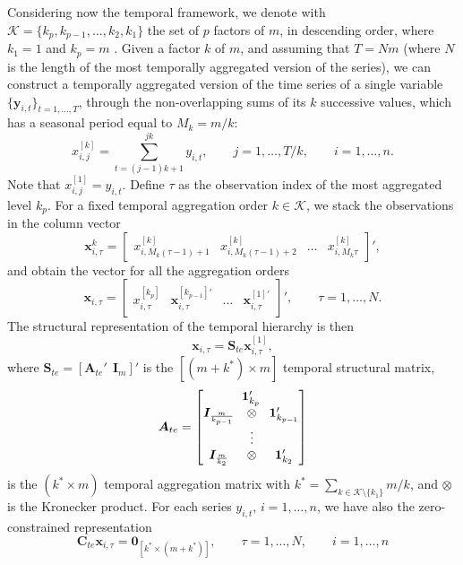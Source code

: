 \documentclass[a4paper,11pt]{article}
\newcommand{\Unovet}{\bm{1}}
\newcommand{\xvet}{\bm{x}}
\newcommand{\yvet}{\bm{y}}
\newcommand{\Avet}{\bm{A}}
\newcommand{\Cvet}{\bm{C}}
\newcommand{\Ivet}{\bm{I}}
\newcommand{\Svet}{\bm{S}}
\newcommand{\Zerovet}{\bm{0}}
\theoremstyle{definition}
\begin{document}
Considering now the temporal framework, we denote with $\mathcal{K} = \{ k_p , k_{p-1}, \dots, k_2, k_1 \}$ the set of $p$ factors of $m$, in descending order, where $k_1= 1$ and $k_p= m$ \citep{athanasopoulos2017}. Given a factor $k$ of $m$, and assuming that $T = N m$ (where $N$ is the length of the most temporally aggregated version of the series), we can construct a temporally aggregated version of the time series of a single variable $\{\yvet_{i,t}\}_{t = 1, \dots, T}$, through the non-overlapping sums of its $k$ successive values, which has a seasonal period equal to $M_k= m/k$:
$$
	x_{i,j}^{[k]} = \sum_{t=(j-1)k+1}^{jk} y_{i,t},\qquad j = 1,\dots, T/k, \qquad i = 1,\dots,n.
$$
Note that $x_{i,j}^{[1]}=y_{i,t}$. Define $\tau$ as the observation index of the most aggregated level $k_p$. For a fixed temporal aggregation order $k \in \mathcal{K}$, we stack the observations in the column vector
$$
	\xvet_{i,\tau}^{k} = \begin{bmatrix}x_{i,M_k(\tau-1)+1}^{[k]} & x_{i,M_k(\tau-1)+2}^{[k]} & \dots & x_{i,M_k\tau}^{[k]}\end{bmatrix}',
$$
and obtain the vector for all the aggregation orders
$$
	\xvet_{i,\tau} = \begin{bmatrix}
		x_{i,\tau}^{[k_p]}               &
		\xvet_{i,\tau}^{[k_{p-1}]\prime} &
		\dots                            &
		\xvet_{i,\tau}^{[1]\prime}
	\end{bmatrix}',\qquad \tau = 1,\dots,N.
$$
The structural representation of the temporal hierarchy \citep{athanasopoulos2017} is then
$$
	\xvet_{i,\tau} = \Svet_{te}\xvet_{i,\tau}^{[1]},
$$
where $\Svet_{te} = [\Avet_{te}' ~~ \Ivet_{m}]'$ is the $[(m+k^\ast) \times m]$ temporal structural matrix,
$$
	\Avet_{te} = \begin{bmatrix}
		\multicolumn{3}{c}{\Unovet_{k_p}'}                       \\
		\Ivet_{\frac{m}{k_{p-1}}} & \otimes & \Unovet_{k_{p-1}}' \\
		                          & \vdots  &                    \\
		\Ivet_{\frac{m}{k_{2}}}   & \otimes & \Unovet_{k_2}'
	\end{bmatrix}
$$
is the $(k^\ast \times m)$ temporal aggregation matrix with $k^\ast = \sum_{k \in \mathcal{K}\setminus\{k_1\}} m/k$, and $\otimes$ is the Kronecker product. For each series $y_{i,t}$, $i = 1,\dots,n$, we have also the zero-constrained representation
\begin{equation}
	\label{eq:te_con}
	\Cvet_{te}\xvet_{i,\tau} = \Zerovet_{[k^\ast \times (m+k^\ast)]}, \qquad \tau = 1,\dots,N, \qquad i = 1,\dots, n
\end{equation}
\end{document}
